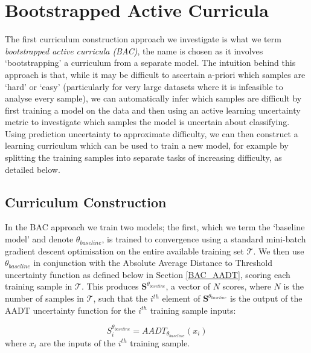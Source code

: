 \chapter{Bootstrapped Active Curricula}\label{ch:BootstrappedActiveCurricula}
The first curriculum construction approach we investigate is what we term \textit{bootstrapped active curricula (BAC)}, the name is chosen as it involves `bootstrapping' a curriculum from a separate model. The intuition behind this approach is that, while it may be difficult to ascertain a-priori which samples are `hard' or `easy' (particularly for very large datasets where it is infeasible to analyse every sample), we can automatically infer which samples are difficult by first training a model on the data and then using an active learning uncertainty metric to investigate which samples the model is uncertain about classifying. Using prediction uncertainty to approximate difficulty, we can then construct a learning curriculum which can be used to train a new model, for example by splitting the training samples into separate tasks of increasing difficulty, as detailed below.
\section{Curriculum Construction}
In the BAC approach we train two models; the first, which we term the `baseline model' and denote  $\theta_{baseline}$, is trained to convergence using a standard mini-batch gradient descent optimisation on the entire available training set $\mathcal{T}$. We then use $\theta_{baseline}$ in conjunction with the Absolute Average Distance to Threshold uncertainty function as defined below in Section \ref{BAC_AADT}, scoring each training sample in $\mathcal{T}$. This produces $\mathbf{S}^{\theta_{baseline}}$, a vector of $N$ scores, where $N$ is the number of samples in $\mathcal{T}$, such that the $i^{th}$ element of $\mathbf{S}^{\theta_{baseline}}$ is the output of the AADT uncertainty function for the $i^{th}$ training sample inputs:

\begin{equation}\label{eq:BAC_S}
S^{\theta_{baseline}}_i = AADT_{\theta_{baseline}}(x_i) 
\end{equation}
where $x_i$ are the inputs of the $i^{th}$ training sample.

